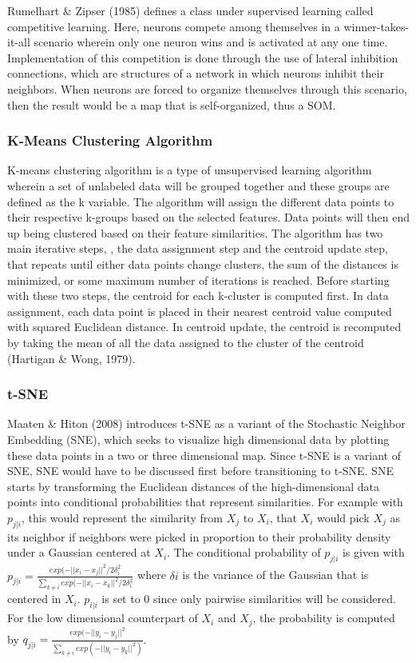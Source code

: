 Rumelhart \& Zipser (1985) defines a class under supervised learning called competitive learning. Here, neurons compete among themselves in a winner-takes-it-all scenario wherein only one neuron wins and is activated at any one time. Implementation of this competition is done through the use of lateral inhibition connections, which are structures of a network in which neurons inhibit their neighbors. When neurons are forced to organize themselves through this scenario, then the result would be a map that is self-organized, thus a SOM.

\subsubsection{K-Means Clustering Algorithm}

K-means clustering algorithm is a type of unsupervised learning algorithm wherein a set of unlabeled data will be grouped together and these groups are defined as the k variable. The algorithm will assign the different data points to their respective k-groups based on the selected features. Data points will then end up being clustered based on their feature similarities. The algorithm has two main iterative steps, , the data assignment step and the centroid update step, that repeats until either data points change clusters, the sum of the distances is minimized, or some maximum number of iterations is reached. Before starting with these two steps, the centroid for each k-cluster is computed first. In data assignment, each data point is placed in their nearest centroid value computed with squared Euclidean distance. In centroid update, the centroid is recomputed by taking the mean of all the data assigned to the cluster of the centroid (Hartigan \& Wong, 1979).

\subsubsection{t-SNE}

Maaten \& Hiton (2008) introduces t-SNE as a variant of the Stochastic Neighbor Embedding (SNE), which seeks to visualize high dimensional data by plotting these data points in a two or three dimensional map. Since t-SNE is a variant of SNE, SNE would have to be discussed first before transitioning to t-SNE. SNE starts by transforming the Euclidean distances of the high-dimensional data points into conditional probabilities that represent similarities. For example with $p_{j|i}$, this would represent the similarity from $X_j$ to $X_i$, that $X_i$ would pick $X_j$ as its neighbor if neighbors were picked in proportion to their probability density under a Gaussian centered at $X_i$. The conditional probability of $p_{j|i}$ is given with $p_{j|i} = \frac{exp(-||x_i-x_j||^2 /2 \delta_i^2}{\sum_{k \neq i} exp(-||x_i - x_k||^2 / 2 \delta_i^2}$ where $\delta i$ is the variance of the Gaussian that is centered in $X_i$. $p_{i|i}$ is set to 0 since only pairwise similarities will be considered. For the low dimensional counterpart of $X_i$ and $X_j$, the probability is computed by $q_{j|i} = \frac{exp(-||y_i - y_j||^2}{\sum_{k \neq i} exp(-||y_i - y_k||^2)}$.


